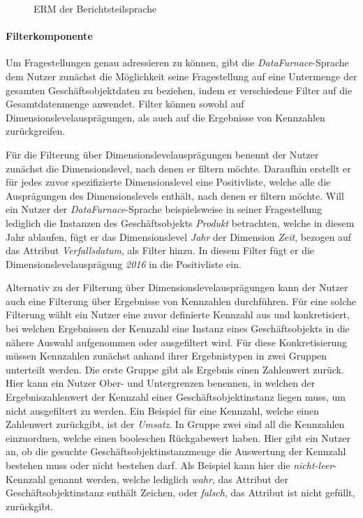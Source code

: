 \documentclass[
  language=german, %
  type=bachelor,%
  ngerman
]{isthesis}
\begin{document}
\begin{content}
  \begin{figure}
    \resizebox{200px}{!}{}
    \caption{\acrshort{ERM} der Berichtsteilsprache}\label{language_spec-erm-bericht}
  \end{figure}
  
  \paragraph{Filterkomponente}\label{paragraph:filternde-komponente} Um
  Fragestellungen genau adressieren zu können, gibt die
  \textit{DataFurnace}-Sprache dem Nutzer zunächst die Möglichkeit seine
  Fragestellung auf eine Untermenge der gesamten Geschäftsobjektdaten zu
  beziehen, indem er verschiedene Filter auf die Gesamtdatenmenge anwendet.
  Filter können sowohl auf Dimensions\-level\-ausprägungen, als auch auf die
  Ergebnisse von Kennzahlen zurückgreifen. 
  
  Für die Filterung über Dimensions\-levelausprägungen benennt der Nutzer
  zunächst die Dimensions\-level, nach denen er filtern möchte. Daraufhin erstellt
  er für jedes zuvor spezifizierte Dimensions\-level eine Positivliste, welche
  alle die Ausprägungen des Dimensions\-levels enthält, nach denen er filtern
  möchte. Will ein Nutzer der \textit{DataFurnace}-Sprache beispielsweise in
  seiner Fragestellung lediglich die Instanzen des Geschäftsobjekts
  \textit{Produkt} betrachten, welche in diesem Jahr ablaufen, fügt er das
  Dimensions\-level \textit{Jahr} der Dimension \textit{Zeit}, bezogen auf das
  Attribut \textit{Verfallsdatum}, als Filter hinzu. In diesem Filter fügt er
  die Dimensions\-level\-ausprägung \textit{2016} in die Positivliste ein.

  Alternativ zu der Filterung über Dimensions\-levelausprägungen kann der
  Nutzer auch eine Filterung über Ergebnisse von Kennzahlen durchführen. Für
  eine solche Filterung wählt ein Nutzer eine zuvor definierte
  Kennzahl aus und konkretisiert, bei welchen Ergebnissen der Kennzahl eine
  Instanz eines Geschäftsobjekts in die nähere Auswahl aufgenommen oder
  ausgefiltert wird.  Für diese Konkretisierung müssen Kennzahlen zunächst
  anhand ihrer Ergebnistypen in zwei Gruppen unterteilt werden. Die erste
  Gruppe gibt als Ergebnis einen Zahlenwert zurück. Hier kann ein Nutzer Ober-
  und Untergrenzen benennen, in welchen der Ergebniszahlenwert der Kennzahl
  einer Geschäftsobjektinstanz liegen muss, um nicht ausgefiltert zu werden.
  Ein Beispiel für eine Kennzahl, welche einen Zahlenwert zurückgibt, ist der
  \textit{Umsatz}. In Gruppe zwei sind all die Kennzahlen einzuordnen, welche
  einen booleschen Rückgabewert haben. Hier gibt ein Nutzer an, ob die gesuchte
  Geschäftsobjektinstanzmenge die Auswertung der Kennzahl bestehen muss oder
  nicht bestehen darf. Als Beispiel kann hier die \textit{nicht-leer}-Kennzahl
  genannt werden, welche lediglich \textit{wahr}, das Attribut der
  Geschäftsobjektinstanz enthält Zeichen, oder \textit{falsch}, das
  Attribut ist nicht gefüllt, zurückgibt.


\end{content}
\end{document}
